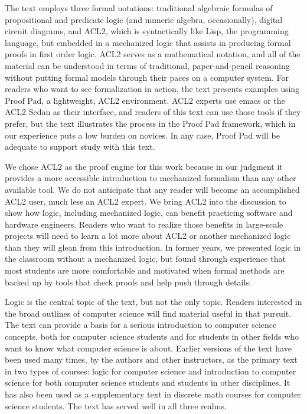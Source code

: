 \begin{preface}
The text employs three formal notations:
traditional algebraic formulas of propositional and predicate logic
(and numeric algebra, occasionally),
digital circuit diagrams, and ACL2, which is syntactically
like Lisp, the programming language, but embedded
in a mechanized logic that assists in producing
formal proofs in first order logic.
ACL2 serves as a mathematical notation, and all
of the material can be understood in terms of
traditional, paper-and-pencil reasoning
without putting formal models
through their paces on a computer system.
For readers who want to see formalization
in action, the text presents examples using
Proof Pad, a lightweight, ACL2 environment.
ACL2 experts use emacs or the ACL2 Sedan
as their interface, and readers of this text can
use those tools if they prefer, but the text
illustrates the process in the Proof Pad framework,
which in our experience puts a low burden on novices.
In any case, Proof Pad will be adequate to support
study with this text.

We chose ACL2 as the proof engine for this work
because in our judgment it provides a more accessible
introduction to mechanized formalism than any other
available tool. We do not anticipate that any
reader will become an accomplished ACL2 user,
much less an ACL2 expert. We bring ACL2 into the discussion
to show how logic, including mechanized logic,
can benefit practicing software and hardware engineers.
Readers who want to realize those benefits in
large-scale projects will need to learn a lot more
about ACL2 or another mechanized logic than they
will glean from this introduction.
In former years, we presented logic in the classroom
without a mechanized logic, but found through experience
that most students are more comfortable and motivated
when formal methods are backed up by tools
that check proofs and help
push through details.

Logic is the central topic of the text, but not the only topic.
Readers interested in the broad outlines of computer science
will find material useful in that pursuit.
The text can provide a basis for a serious introduction
to computer science concepts, both for computer science students
and for students in other fields who want to know
what computer science is about.
Earlier versions of the text have been used many times,
by the authors and other instructors,
as the primary text in two types of courses: logic for computer science
and introduction to computer science for both computer science students
and students in other disciplines.
It has also been used as a supplementary
text in discrete math courses for computer science students.
The text has served well in all three realms.


\end{preface}
